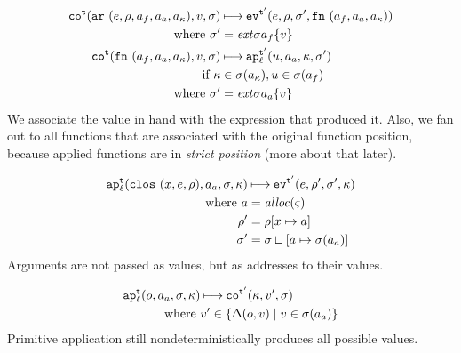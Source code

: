 \documentclass[preprint,onecolumn,9pt]{sigplanconf} %
\begin{document}
\begin{align*}
\co[^\mcntr]{\kar{\mexp,\menv,\maddr_f,\maddr_a,\maddr_\mkont},\mval,\msto} & \machstep
\ev[^{\mcntr'}]{\mexp,\menv,\msto',\kfn{\maddr_f,\maddr_a,\maddr_\mkont}} \\
\text{ where }
  \msto' &= \ext{\msto}{\maddr_f}{\{\mval\}}
\\
\co[^\mcntr]{\kfn{\maddr_f,\maddr_a,\maddr_\mkont},\mval,\msto} & \machstep
\ap[^{\mcntr'}_\mlab]{\mvalx{u},\maddr_a,\mkont,\msto'}
\\
\text{ if } \mkont &\in \msto(\maddr_\mkont), \mvalx{u} \in \msto(\maddr_f) \\
\text{ where }
 \msto' &= \ext{\msto}{\maddr_a}{\{\mval\}}
\end{align*}
We associate the value in hand with the expression that produced
it. Also, we fan out to all functions that are associated with the
original function position, because applied functions are in
\emph{strict position} (more about that later).

\begin{align*}
\ap[^\mcntr_\mlab]{\clos{\mvar,\mexp,\menv},\maddr_a, \msto,\mkont} & \machstep
\ev[^{\mcntr'}]{\mexp,\menv',\msto',\mkont} \\
\text{ where }
\maddr &= \alloc(\mstate) \\
\menv' &= \menv[\mvar\mapsto\maddr] \\
\msto' &= \msto\sqcup[\maddr \mapsto \msto(\maddr_a)]
\end{align*}
Arguments are not passed as values, but as addresses to their values.

\begin{align*}
\ap[^\mcntr_\mlab]{\mop,\maddr_a,\msto,\mkont} & \machstep
\co[^{\mcntr'}]{\mkont,\mval',\msto}
\\
\text{ where }& \mval'\in \{\interpdelta(\mop,\mval) \mid \mval \in \msto(\maddr_a)\}
\end{align*}
Primitive application still nondeterministically produces all possible values.


\end{document}
